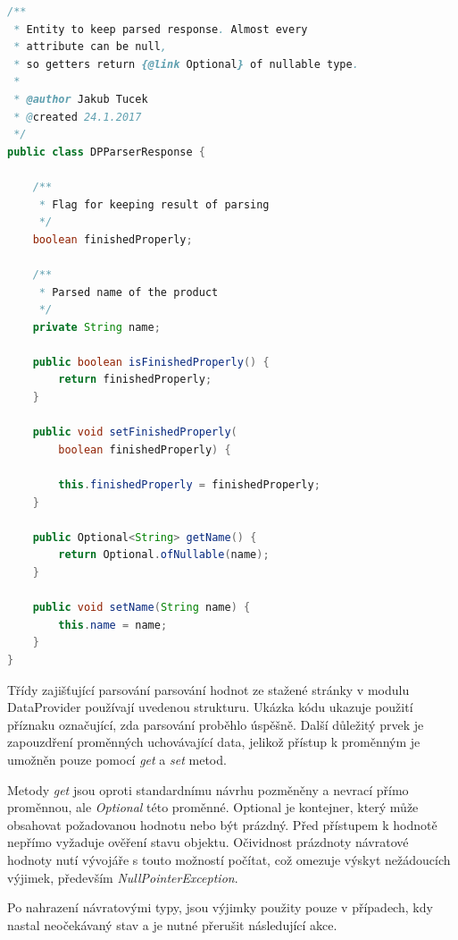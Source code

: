 \documentclass[thesis=B,czech]{FITthesis}[2012/06/26]
\begin{document}
\begin{lstlisting}[language=Java]
/**
 * Entity to keep parsed response. Almost every 
 * attribute can be null, 
 * so getters return {@link Optional} of nullable type.
 *
 * @author Jakub Tucek
 * @created 24.1.2017
 */
public class DPParserResponse {

    /**
     * Flag for keeping result of parsing
     */
    boolean finishedProperly;

    /**
     * Parsed name of the product
     */
    private String name;

    public boolean isFinishedProperly() {
        return finishedProperly;
    }

    public void setFinishedProperly(
    	boolean finishedProperly) {
    	
        this.finishedProperly = finishedProperly;
    }

    public Optional<String> getName() {
        return Optional.ofNullable(name);
    }

    public void setName(String name) {
        this.name = name;
    }
}
\end{lstlisting}

Třídy zajišťující parsování parsování hodnot ze stažené stránky v modulu DataProvider používají uvedenou strukturu.
Ukázka kódu ukazuje použití příznaku označující, zda parsování proběhlo úspěšně. Další důležitý prvek
je zapouzdření proměnných uchovávající data\cite{encapsulation}, jelikož přístup k proměnným je umožněn pouze pomocí \textit{get} a \textit{set} metod.
\par
Metody \textit{get} jsou oproti standardnímu návrhu pozměněny a nevrací přímo proměnnou, ale \textit{Optional} této proměnné.
Optional je kontejner, který může obsahovat požadovanou hodnotu\cite{optional} nebo být prázdný. 
Před přístupem k hodnotě nepřímo vyžaduje ověření stavu objektu. Očividnost prázdnoty návratové hodnoty nutí vývojáře s touto možností počítat, což
omezuje výskyt nežádoucích výjimek, především \textit{NullPointerException}\cite{nullPointerException}.
\par
Po nahrazení návratovými typy, jsou výjimky použity pouze v případech, kdy nastal neočekávaný stav a je nutné přerušit následující akce.
\end{document}
